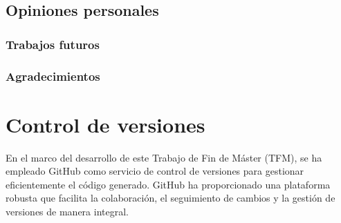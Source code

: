 \documentclass[12pt,a4paper,onecolumn,oneside]{report}
\begin{document}
\section*{Opiniones personales}



\subsection*{Trabajos futuros}


\subsection*{Agradecimientos}



\renewcommand\bibname{Lista de referencias}


	

	



\nocite{*}



\renewcommand{\appendixname}{Anexo}
\appendix

\chapter{Control de versiones}
\label{Control de versiones}

En el marco del desarrollo de este Trabajo de Fin de Máster (TFM), se ha empleado GitHub como servicio de control de versiones para gestionar eficientemente el código generado. GitHub ha proporcionado una plataforma robusta que facilita la colaboración, el seguimiento de cambios y la gestión de versiones de manera integral.
\end{document}
